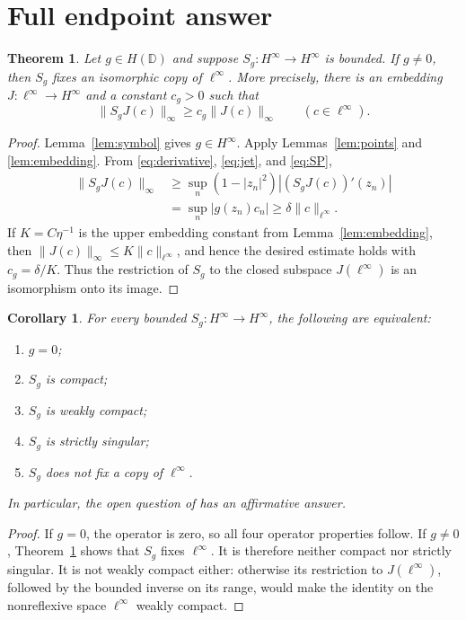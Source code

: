 \documentclass[11pt]{article}
\newtheorem{theorem}{Theorem}
\newtheorem{corollary}{Corollary}
\newcommand{\D}{\mathbb D}
\begin{document}
\section{Full endpoint answer}

\begin{theorem}\label{thm:main}
Let $g\in H(\D)$ and suppose $S_g:H^\infty\to H^\infty$ is bounded.  If
$g\ne0$, then $S_g$ fixes an isomorphic copy of $\ell^\infty$.  More
precisely, there is an embedding $J:\ell^\infty\to H^\infty$ and a constant
$c_g>0$ such that
\[
 \|S_gJ(c)\|_\infty\ge c_g\|J(c)\|_\infty
 \qquad(c\in\ell^\infty).
\]
\end{theorem}

\begin{proof}
Lemma~\ref{lem:symbol} gives $g\in H^\infty$.  Apply
Lemmas~\ref{lem:points} and \ref{lem:embedding}.  From
\eqref{eq:derivative}, \eqref{eq:jet}, and \eqref{eq:SP},
\begin{align*}
 \|S_gJ(c)\|_\infty
 &\ge \sup_n(1-|z_n|^2)|(S_gJ(c))'(z_n)|\\
 &=\sup_n|g(z_n)c_n|
 \ge\delta\|c\|_{\ell^\infty}.
\end{align*}
If $K=C\eta^{-1}$ is the upper embedding constant from
Lemma~\ref{lem:embedding}, then
$\|J(c)\|_\infty\le K\|c\|_{\ell^\infty}$, and hence the desired estimate
holds with $c_g=\delta/K$.  Thus the restriction of $S_g$ to the closed
subspace $J(\ell^\infty)$ is an isomorphism onto its image.
\end{proof}

\begin{corollary}\label{cor:classification}
For every bounded $S_g:H^\infty\to H^\infty$, the following are equivalent:
\begin{enumerate}
\item $g=0$;
\item $S_g$ is compact;
\item $S_g$ is weakly compact;
\item $S_g$ is strictly singular;
\item $S_g$ does not fix a copy of $\ell^\infty$.
\end{enumerate}
In particular, the open question of \cite{LLW} has an affirmative answer.
\end{corollary}

\begin{proof}
If $g=0$, the operator is zero, so all four operator properties follow.
If $g\ne0$, Theorem~\ref{thm:main} shows that $S_g$ fixes $\ell^\infty$.
It is therefore neither compact nor strictly singular.  It is not weakly
compact either: otherwise its restriction to $J(\ell^\infty)$, followed by
the bounded inverse on its range, would make the identity on the
nonreflexive space $\ell^\infty$ weakly compact.
\end{proof}
\end{document}
